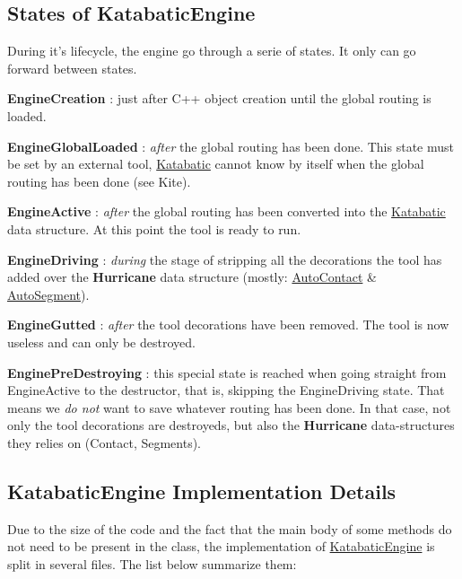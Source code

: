 \hypertarget{classKatabatic_1_1KatabaticEngine_secEngineStates}{}\subsection{States of Katabatic\-Engine}\label{classKatabatic_1_1KatabaticEngine_secEngineStates}
During it's lifecycle, the engine go through a serie of states. It only can go forward between states.
\begin{DoxyItemize}
\item {\bfseries Engine\-Creation} \-: just after C++ object creation until the global routing is loaded.
\item {\bfseries Engine\-Global\-Loaded} \-: {\itshape after} the global routing has been done. This state must be set by an external tool, \hyperlink{namespaceKatabatic}{Katabatic} cannot know by itself when the global routing has been done (see Kite).
\item {\bfseries Engine\-Active} \-: {\itshape after} the global routing has been converted into the \hyperlink{namespaceKatabatic}{Katabatic} data structure. At this point the tool is ready to run.
\item {\bfseries Engine\-Driving} \-: {\itshape during} the stage of stripping all the decorations the tool has added over the {\bf Hurricane} data structure (mostly\-: \hyperlink{classKatabatic_1_1AutoContact}{Auto\-Contact} \& \hyperlink{classKatabatic_1_1AutoSegment}{Auto\-Segment}).
\item {\bfseries Engine\-Gutted} \-: {\itshape after} the tool decorations have been removed. The tool is now useless and can only be destroyed.
\item {\bfseries Engine\-Pre\-Destroying} \-: this special state is reached when going straight from Engine\-Active to the destructor, that is, skipping the Engine\-Driving state. That means we {\itshape do not} want to save whatever routing has been done. In that case, not only the tool decorations are destroyeds, but also the {\bf Hurricane} data-\/structures they relies on (Contact, Segments).
\end{DoxyItemize}\hypertarget{classKatabatic_1_1KatabaticEngine_secEngineImpl}{}\subsection{Katabatic\-Engine Implementation Details}\label{classKatabatic_1_1KatabaticEngine_secEngineImpl}
Due to the size of the code and the fact that the main body of some methods do not need to be present in the class, the implementation of \hyperlink{classKatabatic_1_1KatabaticEngine}{Katabatic\-Engine} is split in several files. The list below summarize them\-:
